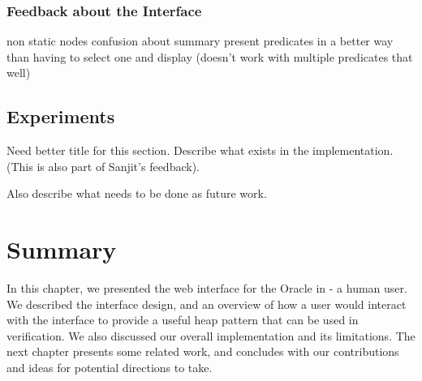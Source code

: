 \subsubsection{Feedback about the Interface}
non static nodes
confusion about summary
present predicates in a better way than having to select one and display (doesn't work with multiple predicates that well)

\subsection{Experiments}
Need better title for this section. Describe what exists in the implementation.
(This is also part of Sanjit's feedback).

Also describe what needs to be done as future work.

\section*{Summary}
In this chapter, we presented the web interface for the Oracle in \verifier - a human
user. We described the interface design, and an overview of how a user would interact
with the interface to provide a useful heap pattern that can be used in verification. We
also discussed our overall implementation and its limitations. The next chapter presents
some related work, and concludes with  our contributions and ideas for potential
directions to take.
